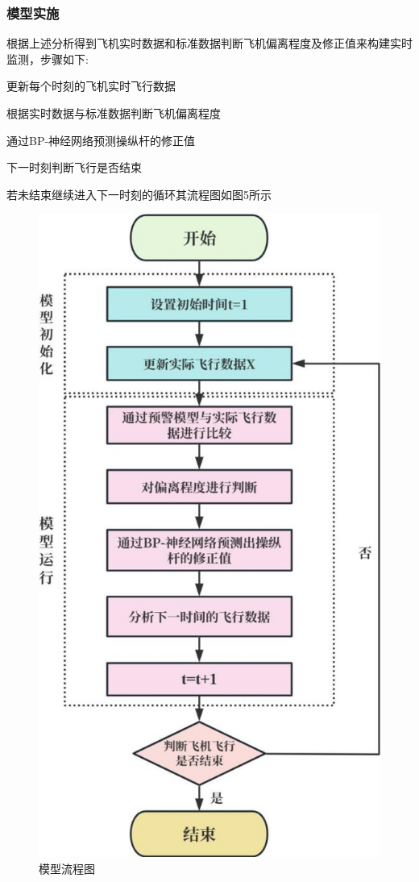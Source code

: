 \documentclass[UTF8]{ctexart}
\begin{document}
\subsubsection{模型实施}
根据上述分析得到飞机实时数据和标准数据判断飞机偏离程度及修正值来构建实时监测，步骤如下: \par
[1]更新每个时刻的飞机实时飞行数据 \par
[2]根据实时数据与标准数据判断飞机偏离程度\par
[3]通过BP-神经网络预测操纵杆的修正值 \par
[4]下一时刻判断飞行是否结束 \par
[5]若未结束继续进入下一时刻的循环其流程图如图5所示 \par
	\begin{figure}[h]
	\centering
	\includegraphics[scale=1]{模型流程图.jpeg}
	\caption{模型流程图}
\end{figure}\par
\end{document}

